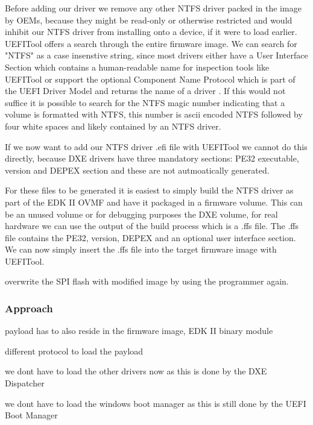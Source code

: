 Before adding our driver we remove any other NTFS driver packed in the image by OEMs, because they might be read-only or otherwise restricted and would inhibit our NTFS driver from installing onto a device, if it were to load earlier. UEFITool offers a search through the entire firmware image. We can search for "NTFS" as a case insenstive string, since most drivers either have a User Interface Section which contains a human-readable name for inspection tools like UEFITool \cite[Vol 3, 3.2.5]{pi-spec} or support the optional Component Name Protocol which is part of the UEFI Driver Model and returns the name of a driver \cite[11.5]{uefi-spec}. If this would not suffice it is possible to search for the NTFS magic number indicating that a volume is formatted with NTFS, this number is ascii encoded NTFS followed by four white spaces and likely contained by an NTFS driver.

If we now want to add our NTFS driver .efi file with UEFITool we cannot do this directly, because DXE drivers have three mandatory sections: PE32 executable, version and DEPEX section \cite[Vol 3, 2.1.4.1.4]{pi-spec} and these are not autmoatically generated.

For these files to be generated it is easiest to simply build the NTFS driver as part of the EDK II OVMF and have it packaged in a firmware volume. This can be an unused volume or for debugging purposes the DXE volume, for real hardware we can use the output of the build process which is a .ffs file. The .ffs file contains the PE32, version, DEPEX and an optional user interface section.
We can now simply insert the .ffs file into the target firmware image with UEFITool.

overwrite the SPI flash with modified image by using the programmer again.

\subsubsection{Approach}

payload has to also reside in the firmware image, EDK II binary module

different protocol to load the payload

we dont have to load the other drivers now as this is done by the DXE Dispatcher

we dont have to load the windows boot manager as this is still done by the UEFI Boot Manager
